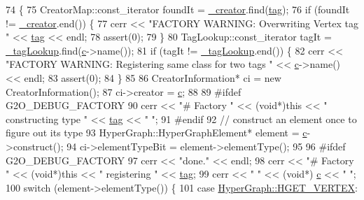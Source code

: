 \begin{DoxyCode}
74 \{
75   CreatorMap::const\_iterator foundIt = \hyperlink{classg2o_1_1Factory_a38e27fb1014dfb8691f4df045ebb5130}{\_creator}.find(\hyperlink{classg2o_1_1Factory_a337d1377ea4e47c31dd04e85e51a2516}{tag});
76   \textcolor{keywordflow}{if} (foundIt != \hyperlink{classg2o_1_1Factory_a38e27fb1014dfb8691f4df045ebb5130}{\_creator}.end()) \{
77     cerr << \textcolor{stringliteral}{"FACTORY WARNING: Overwriting Vertex tag "} << \hyperlink{classg2o_1_1Factory_a337d1377ea4e47c31dd04e85e51a2516}{tag} << endl;
78     assert(0);
79   \}
80   TagLookup::const\_iterator tagIt = \hyperlink{classg2o_1_1Factory_a93fbd79ea000ed88101c1f23b19e6e2a}{\_tagLookup}.find(\hyperlink{sparse__block__matrix_8hpp_a4e1e0e72dd773439e333c84dd762a9c3}{c}->name());
81   \textcolor{keywordflow}{if} (tagIt != \hyperlink{classg2o_1_1Factory_a93fbd79ea000ed88101c1f23b19e6e2a}{\_tagLookup}.end()) \{
82     cerr << \textcolor{stringliteral}{"FACTORY WARNING: Registering same class for two tags "} << \hyperlink{sparse__block__matrix_8hpp_a4e1e0e72dd773439e333c84dd762a9c3}{c}->name() << endl;
83     assert(0);
84   \}
85 
86   CreatorInformation* ci = \textcolor{keyword}{new} CreatorInformation();
87   ci->creator = \hyperlink{sparse__block__matrix_8hpp_a4e1e0e72dd773439e333c84dd762a9c3}{c};
88 
89 \textcolor{preprocessor}{#ifdef G2O\_DEBUG\_FACTORY}
90   cerr << \textcolor{stringliteral}{"# Factory "} << (\textcolor{keywordtype}{void}*)\textcolor{keyword}{this} << \textcolor{stringliteral}{" constructing type "} << \hyperlink{classg2o_1_1Factory_a337d1377ea4e47c31dd04e85e51a2516}{tag} << \textcolor{stringliteral}{" "};
91 \textcolor{preprocessor}{#endif}
92   \textcolor{comment}{// construct an element once to figure out its type}
93   HyperGraph::HyperGraphElement* element = \hyperlink{sparse__block__matrix_8hpp_a4e1e0e72dd773439e333c84dd762a9c3}{c}->construct();
94   ci->elementTypeBit = element->elementType();
95 
96 \textcolor{preprocessor}{#ifdef G2O\_DEBUG\_FACTORY}
97   cerr << \textcolor{stringliteral}{"done."} << endl;
98   cerr << \textcolor{stringliteral}{"# Factory "} << (\textcolor{keywordtype}{void}*)\textcolor{keyword}{this} << \textcolor{stringliteral}{" registering "} << \hyperlink{classg2o_1_1Factory_a337d1377ea4e47c31dd04e85e51a2516}{tag};
99   cerr << \textcolor{stringliteral}{" "} << (\textcolor{keywordtype}{void}*) \hyperlink{sparse__block__matrix_8hpp_a4e1e0e72dd773439e333c84dd762a9c3}{c} << \textcolor{stringliteral}{" "};
100   \textcolor{keywordflow}{switch} (element->elementType()) \{
101     \textcolor{keywordflow}{case} \hyperlink{classg2o_1_1HyperGraph_af603119d5d3475aed6e34ee9d701b69ea4a278c79154a0d4c381a7e265d7048f5}{HyperGraph::HGET\_VERTEX}:

\end{DoxyCode}
